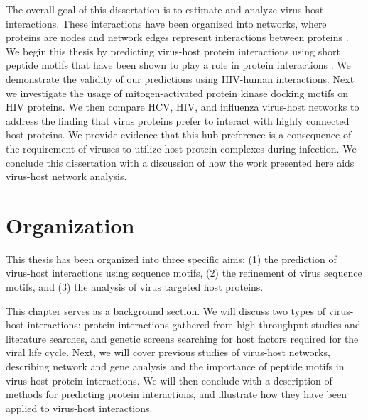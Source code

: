 The overall goal of this dissertation is to estimate and analyze
virus-host interactions. These interactions have been organized into
networks, where proteins are nodes and network edges represent
interactions between proteins \cite{han04}. We begin this thesis by
predicting virus-host protein interactions using short peptide motifs
that have been shown to play a role in protein interactions
\cite{kadaveru08}. We demonstrate the validity of our predictions
using HIV-human interactions. Next we investigate the usage of
mitogen-activated protein kinase docking motifs on HIV proteins. We
then compare HCV, HIV, and influenza virus-host networks to address
the finding that virus proteins prefer to interact with highly
connected host proteins. We provide evidence that this hub preference
is a consequence of the requirement of viruses to utilize host protein
complexes during infection. We conclude this dissertation with a
discussion of how the work presented here aids virus-host network
analysis.

\section{Organization}
This thesis has been organized into three specific aims: (1) the
prediction of virus-host interactions using sequence motifs, (2) the
refinement of virus sequence motifs, and (3) the analysis of virus
targeted host proteins.

This chapter serves as a background section. We will discuss two types
of virus-host interactions: protein interactions gathered from high
throughput studies and literature searches, and genetic screens
searching for host factors required for the viral life cycle. Next, we
will cover previous studies of virus-host networks, describing network
and gene analysis and the importance of peptide motifs in virus-host
protein interactions. We will then conclude with a description of
methods for predicting protein interactions, and illustrate how they
have been applied to virus-host interactions.

